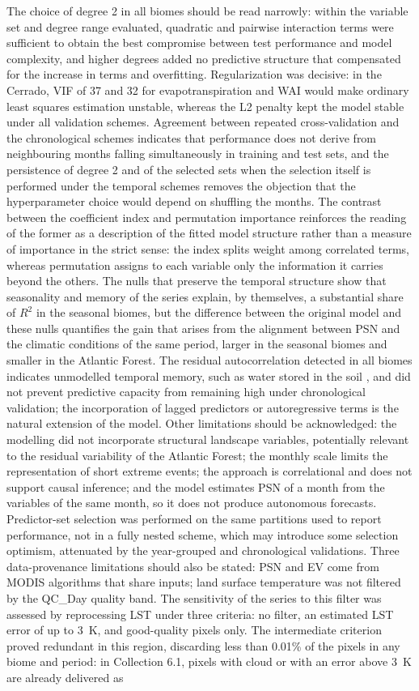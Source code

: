 \documentclass[a4paper,fleqn]{cas-sc}
\begin{document}
The choice of degree 2 in all biomes should be read narrowly: within the variable set and degree range evaluated, quadratic and pairwise interaction terms were sufficient to obtain the best compromise between test performance and model complexity, and higher degrees added no predictive structure that compensated for the increase in terms and overfitting. Regularization was decisive: in the Cerrado, VIF of 37 and 32 for evapotranspiration and WAI would make ordinary least squares estimation unstable, whereas the L2 penalty kept the model stable under all validation schemes. Agreement between repeated cross-validation and the chronological schemes indicates that performance does not derive from neighbouring months falling simultaneously in training and test sets, and the persistence of degree 2 and of the selected sets when the selection itself is performed under the temporal schemes removes the objection that the hyperparameter choice would depend on shuffling the months. The contrast between the coefficient index and permutation importance reinforces the reading of the former as a description of the fitted model structure rather than a measure of importance in the strict sense: the index splits weight among correlated terms, whereas permutation assigns to each variable only the information it carries beyond the others. The nulls that preserve the temporal structure show that seasonality and memory of the series explain, by themselves, a substantial share of $R^2$ in the seasonal biomes, but the difference between the original model and these nulls quantifies the gain that arises from the alignment between PSN and the climatic conditions of the same period, larger in the seasonal biomes and smaller in the Atlantic Forest. The residual autocorrelation detected in all biomes indicates unmodelled temporal memory, such as water stored in the soil \citep{oliveira2005}, and did not prevent predictive capacity from remaining high under chronological validation; the incorporation of lagged predictors or autoregressive terms is the natural extension of the model. Other limitations should be acknowledged: the modelling did not incorporate structural landscape variables, potentially relevant to the residual variability of the Atlantic Forest; the monthly scale limits the representation of short extreme events; the approach is correlational and does not support causal inference; and the model estimates PSN of a month from the variables of the same month, so it does not produce autonomous forecasts. Predictor-set selection was performed on the same partitions used to report performance, not in a fully nested scheme, which may introduce some selection optimism, attenuated by the year-grouped and chronological validations. Three data-provenance limitations should also be stated: PSN and EV come from MODIS algorithms that share inputs; land surface temperature was not filtered by the QC\_Day quality band. The sensitivity of the series to this filter was assessed by reprocessing LST under three criteria: no filter, an estimated LST error of up to 3~K, and good-quality pixels only. The intermediate criterion proved redundant in this region, discarding less than 0.01\% of the pixels in any biome and period: in Collection 6.1, pixels with cloud or with an error above 3~K are already delivered as 
\end{document}
